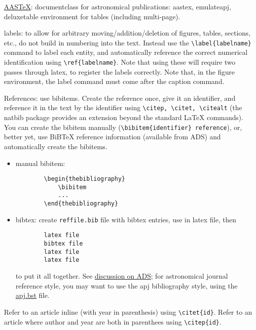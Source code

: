 \documentclass{article}
\begin{document}
\href{http://journals.aas.org/authors/aastex.html}{AASTeX}:
documentclass for astronomical publications: aastex, emulateapj,
deluxetable environment for tables (including multi-page).

labels: to allow for arbitrary moving/addition/deletion of figures,
tables, sections, etc., do not build in numbering into the text.
Instead use the \verb|\label{labelname}| command to label each entity, and
automatically reference the correct numerical identification using
\verb|\ref{labelname}|. Note that using these will require two passes through
latex, to register the labels correctly. Note that, in the figure
environment, the label command must come after the caption command.

References: use bibitems. Create the reference once, give it an
identifier, and reference it in the text by the identifier using
\verb|\citep, \citet, \citealt| (the natbib package provides an extension
beyond the standard LaTeX commands). You can create the bibitem
manually (\verb|\bibitem{identifier} reference|), or, better yet, use BiBTeX
reference information (available from ADS) and automatically create
the bibitems.
\begin{itemize}
    \item manual bibitem:
        \begin{verbatim}
        \begin{thebibliography}
            \bibitem
            ...
        \end{thebibliography}
        \end{verbatim}
    \item bibtex: create {\tt reffile.bib} file with bibtex entries, use
        \verb|| in latex file, then
        \begin{verbatim}
        latex file
        bibtex file
        latex file
        latex file
        \end{verbatim}
        to put it all together. See
        \href{http://ads.harvard.edu/pubs/bibtex/}{discussion on ADS};
        for astronomical journal reference style, you may want
        to use the apj bibliography style, using the
        \href{http://ads.harvard.edu/pubs/bibtex/astronat/apj/apj.bst}
        {apj.bst} file.
\end{itemize}

Refer to an article inline (with year in parenthesis) using
\verb|\citet{id}|.
Refer to an article where author and year are both in parenthees using
\verb|\citep{id}|.
\end{document}
